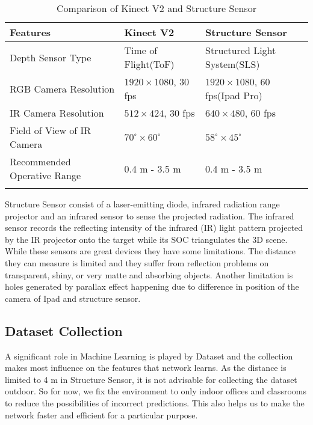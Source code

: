 \begin{table}[h]
\begin{tabular}{@{}lll@{}}
\toprule
\textbf{Features}                    & \textbf{Kinect V2}           & \textbf{Structure Sensor}         \\ \midrule
Depth Sensor Type           & Time of Flight(ToF) & Structured Light System(SLS)                 \\
RGB Camera Resolution       & $1920\times1080$, 30 fps & $1920\times1080$, 60 fps(Ipad Pro)     \\
IR Camera Resolution        & $512\times424$, 30 fps   & $640\times480$, 60 fps                 \\ 
Field of View of IR Camera  & $70^\circ\times60^\circ$           & $58^\circ\times45^\circ$                         \\
Recommended Operative Range & 0.4 m - 3.5 m       & 0.4 m - 3.5 m                                  \\
                            &                     &                                               
\end{tabular}
\caption{Comparison of Kinect V2 and Structure Sensor}
\label{table:KinectVsStructureSensor}
\end{table}

Structure Sensor consist of a laser-emitting diode, infrared radiation range projector and an infrared sensor to sense the projected radiation. The infrared sensor records the reflecting intensity of the infrared (IR) light pattern projected by the IR projector onto the target while its  SOC triangulates the 3D scene. \cite{Kalantari} While these sensors are great devices they have some limitations. The distance they can measure is limited and they suffer from reflection problems on transparent, shiny, or very matte and absorbing objects. Another limitation is holes generated by parallax effect happening due to difference in position of the camera of Ipad and structure sensor.\\

\subsection{Dataset Collection}

A significant role in Machine Learning is played by Dataset and the collection makes most influence on the features that network learns. As the distance is limited to 4 m in Structure Sensor, it is not advisable for collecting the dataset outdoor. So for now, we fix the environment to only indoor offices and classrooms to reduce the possibilities of incorrect predictions. This also helps us to make the network faster and efficient for a particular purpose. \\

